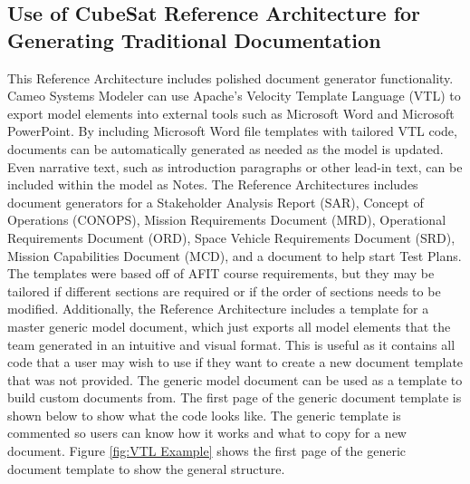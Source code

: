 \documentclass[conference]{joss-pretty}
\begin{document}
\subsection{Use of CubeSat Reference Architecture for Generating Traditional Documentation}
This Reference Architecture includes polished document generator functionality. Cameo Systems Modeler can use Apache's Velocity Template Language (VTL) to export model elements into external tools such as Microsoft Word and Microsoft PowerPoint. By including Microsoft Word file templates with tailored VTL code, documents can be automatically generated as needed as the model is updated. Even narrative text, such as introduction paragraphs or other lead-in text, can be included within the model as Notes. The Reference Architectures includes document generators for a Stakeholder Analysis Report (SAR), Concept of Operations (CONOPS), Mission Requirements Document (MRD), Operational Requirements Document (ORD), Space Vehicle Requirements Document (SRD), Mission Capabilities Document (MCD), and a document to help start Test Plans. The templates were based off of AFIT course requirements, but they may be tailored if different sections are required or if the order of sections needs to be modified. Additionally, the Reference Architecture includes a template for a master generic model document, which just exports all model elements that the team generated in an intuitive and visual format. This is useful as it contains all code that a user may wish to use if they want to create a new document template that was not provided. The generic model document can be used as a template to build custom documents from. The first page of the generic document template is shown below to show what the code looks like. The generic template is commented so users can know how it works and what to copy for a new document. Figure \ref{fig:VTL Example} shows the first page of the generic document template to show the general structure.
\end{document}
